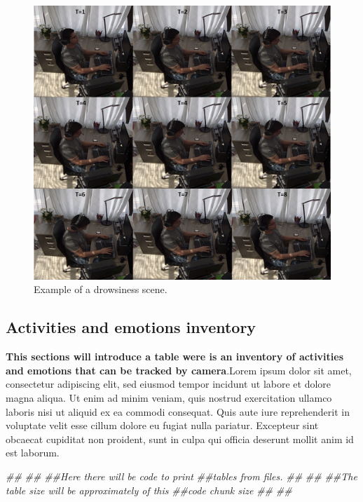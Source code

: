 \documentclass[]{article}
\newenvironment{Shaded}{\begin{snugshade}}{\end{snugshade}}
\newcommand{\CommentTok}[1]{\textcolor[rgb]{0.56,0.35,0.01}{\textit{#1}}}
\begin{document}
\begin{figure}

{\centering \includegraphics[width=0.8\linewidth]{./8_datasets_n_images/images/Drowsiness} 

}

\caption{Example of a drowsiness scene.}\label{fig:drowsiness}
\end{figure}

\hypertarget{activities-and-emotions-inventory}{%
\subsection{Activities and emotions
inventory}\label{activities-and-emotions-inventory}}

\textbf{This sections will introduce a table were is an inventory of
activities and emotions that can be tracked by camera}.Lorem ipsum dolor
sit amet, consectetur adipiscing elit, sed eiusmod tempor incidunt ut
labore et dolore magna aliqua. Ut enim ad minim veniam, quis nostrud
exercitation ullamco laboris nisi ut aliquid ex ea commodi consequat.
Quis aute iure reprehenderit in voluptate velit esse cillum dolore eu
fugiat nulla pariatur. Excepteur sint obcaecat cupiditat non proident,
sunt in culpa qui officia deserunt mollit anim id est laborum.

\begin{Shaded}
\begin{Highlighting}[]
\CommentTok{##}
\CommentTok{##}
\CommentTok{##Here there will be code to print}
\CommentTok{##tables from files.}
\CommentTok{##}
\CommentTok{##}
\CommentTok{##The table size will be approximately of this }
\CommentTok{##code chunk size}
\CommentTok{##}
\CommentTok{##}
\end{Highlighting}
\end{Shaded}
\end{document}
